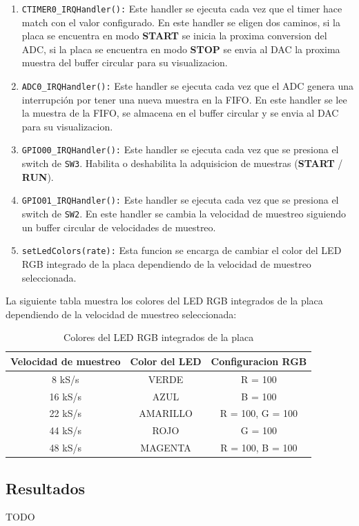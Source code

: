 \documentclass[11pt,a4paper]{article}
\begin{document}
\begin{enumerate}
    \item \texttt{CTIMER0\_IRQHandler():} Este handler se ejecuta cada vez que el
          timer hace match con el valor configurado. En este handler se eligen dos caminos,
          si la placa se encuentra en modo \textbf{START} se inicia la proxima conversion del ADC,
          si la placa se encuentra en modo \textbf{STOP} se envia al DAC la proxima muestra del buffer
          circular para su visualizacion.\@
    \item \texttt{ADC0\_IRQHandler():} Este handler se ejecuta cada vez que el
          ADC genera una interrupción por tener una nueva muestra en la FIFO.\@
          En este handler se lee la muestra de la FIFO, se almacena en el buffer
          circular y se envia al DAC para su visualizacion.
    \item \texttt{GPIO00\_IRQHandler():} Este handler se ejecuta cada vez que se presiona
          el switch de \texttt{SW3}. Habilita o deshabilita la adquisicion de
          muestras (\textbf{START} / \textbf{RUN}).
    \item \texttt{GPIO01\_IRQHandler():} Este handler se ejecuta cada vez que se presiona
          el switch de \texttt{SW2}. En este handler se cambia la velocidad de muestreo
          siguiendo un buffer circular de velocidades de muestreo.
    \item \texttt{setLedColors(rate):} Esta funcion se encarga de cambiar el color del LED RGB
          integrado de la placa dependiendo de la velocidad de muestreo seleccionada.
\end{enumerate}

La siguiente tabla muestra los colores del LED RGB integrados de la placa
dependiendo de la velocidad de muestreo seleccionada:

\begin{table}[H]
    \centering
    \begin{tabular}{|c|c|c|}
        \hline
        \textbf{Velocidad de muestreo} & \textbf{Color del LED} & \textbf{Configuracion RGB} \\
        \hline
        8 kS/s                         & \color{green}VERDE     & R = 100                    \\
        16 kS/s                        & \color{blue}AZUL       & B = 100                    \\
        22 kS/s                        & \color{yellow}AMARILLO & R = 100, G = 100           \\
        44 kS/s                        & \color{red}ROJO        & G = 100                    \\
        48 kS/s                        & \color{magenta}MAGENTA & R = 100, B = 100           \\
        \hline
    \end{tabular}
    \caption{Colores del LED RGB integrados de la placa}
\end{table}

\subsection{Resultados}

TODO
\end{document}
